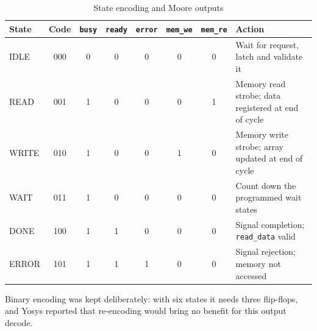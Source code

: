 \documentclass[11pt,a4paper]{article}
\newcommand{\sig}[1]{\texttt{#1}}
\begin{document}
\begin{table}[H]
\centering
\caption{State encoding and Moore outputs}
\label{tab:states}
\small
\begin{tabularx}{\textwidth}{@{}l c c c c c c X@{}}
\toprule
\textbf{State} & \textbf{Code} & \sig{busy} & \sig{ready} & \sig{error} & \sig{mem\_we} & \sig{mem\_re} & \textbf{Action} \\
\midrule
IDLE  & 000 & 0 & 0 & 0 & 0 & 0 & Wait for request, latch and validate it \\
READ  & 001 & 1 & 0 & 0 & 0 & 1 & Memory read strobe; data registered at end of cycle \\
WRITE & 010 & 1 & 0 & 0 & 1 & 0 & Memory write strobe; array updated at end of cycle \\
WAIT  & 011 & 1 & 0 & 0 & 0 & 0 & Count down the programmed wait states \\
DONE  & 100 & 1 & 1 & 0 & 0 & 0 & Signal completion; \sig{read\_data} valid \\
ERROR & 101 & 1 & 1 & 1 & 0 & 0 & Signal rejection; memory not accessed \\
\bottomrule
\end{tabularx}
\end{table}
Binary encoding was kept deliberately: with six states it needs three flip-flops, and Yosys reported that re-encoding would bring no benefit for this output decode.

\end{document}
